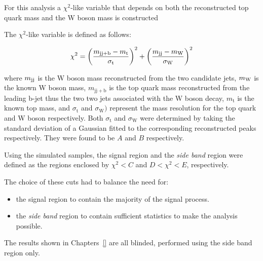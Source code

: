 For this analysis a $\chi^{2}$-like variable that depends on both the reconstructed top quark mass and the W boson mass is constructed 

The $\chi^{2}$-like variable is defined as follows:

\begin{equation}\label{eq:blindingChi2}
   \chi^{2} = {\left(\frac{m_{\mathrm{jj+b}}-m_{\mathrm{t}}}{\sigma_{\mathrm{t}}}\right)}^{2} + {\left(\frac{m_{\rm jj}-m_{\rm W}}{\sigma_{\mathrm{W}}}\right)}^{2}
\end{equation}

where $m_{\rm jj}$ is the W boson mass reconstructed from the two candidate jets, $m_{\rm W}$ is the known W boson mass, $m_{\mathrm{jj+b}}$ is the top quark mass reconstructed from the leading b-jet thus the two two jets associated with the W boson decay, $m_{\mathrm{t}}$ is the known top mass, and $\sigma_{\mathrm{t}}$ and $\sigma_{\mathrm{W}})$ represent the mass resolution for the top quark and W boson respectively.
Both $\sigma_{\mathrm{t}}$ and $\sigma_{\mathrm{W}}$ were determined by taking the standard deviation of a Gaussian fitted to the corresponding reconstructed peaks respectively.
They were found to be $A$ and $B$ respectively.


Using the simulated samples, the signal region and the \emph{side band} region were defined as the regions enclosed by $\chi^{2} < C$ and $D < \chi^{2} <E $, respectively.

The choice of these cuts had to balance the need for:
\begin{itemize}
\item the signal region to contain the majority of the signal process.
\item the \emph{side band} region to contain sufficient statistics to make the analysis possible.
\end{itemize}

The results shown in Chapters~\ref{} are all blinded, \ie performed using the side band region only.
